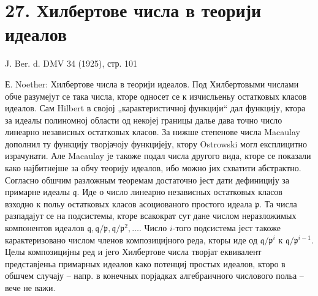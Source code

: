 ﻿\documentclass[11pt]{article}
\begin{document}
\section*{27. Хилбертове числа в теорији идеалов}

\begin{center}
J. Ber. d. DMV 34 (1925), стр. 101
\end{center}

Е. Noether: Хилбертове числа в теорији идеалов. Под Хилбертовыми числами обче разумејут се така числа, кторе односет се к изчисльеньу остатковых класов идеалов. Сам Hilbert в својој „карактеристичној функцији“ дал функцију, ктора за идеалы полиномној области од некојеј границы далье дава точно число линеарно независных остатковых класов. За нижше степенове числа Macaulay дополнил ту функцију творјачоју функцијеју, ктору Ostrowski могл експлицитно израчунати. Але Macaulay је такоже подал числа другого вида, кторе се показали како најбитнејше за обчу теорију идеалов, ибо можно јих схватити абстрактно. Согласно обшчим разложным теоремам достаточно јест дати дефиницију за примарне идеалы $\mathfrak q$. Иде о число линеарно независных остатковых класов взходно к польу остатковых класов асоциованого простого идеала $\mathfrak p$. Та числа разпадајут се на подсистемы, кторе всакократ сут дане числом неразложимых компонентов идеалов $\mathfrak q,\mathfrak q/\mathfrak p,\mathfrak q/\mathfrak p^2,\ldots$. Число $i$-того подсистема јест такоже карактеризовано числом членов композицијного реда, кторы иде од $\mathfrak q/\mathfrak p^i$ к $\mathfrak q/\mathfrak p^{i-1}$. Целы композицијны ред и јего Хилбертове числа творјат еквивалент представјеньа примарных идеалов како потенциј простых идеалов, кторо в обшчем случају -- напр. в конечных порјадках алгебраичного числового польа -- вече не важи.
\end{document}
